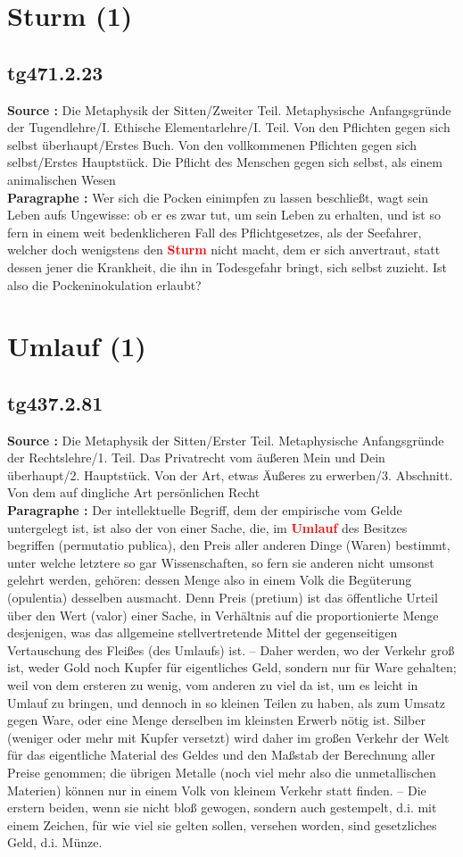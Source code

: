 \documentclass[a4paper,12pt,twoside]{book}
\newcommand{\match}[1]{\textcolor{red}{\textbf{#1}}}
\newcommand{\unnumberedsection}[1]{
	\section*{#1}
	\addcontentsline{toc}{section}{#1}
	\markright{#1}
}
\begin{document}
	\unnumberedsection{Sturm (1)} 
	\subsection*{tg471.2.23} 
	\textbf{Source : }Die Metaphysik der Sitten/Zweiter Teil. Metaphysische Anfangsgründe der Tugendlehre/I. Ethische Elementarlehre/I. Teil. Von den Pflichten gegen sich selbst überhaupt/Erstes Buch. Von den vollkommenen Pflichten gegen sich selbst/Erstes Hauptstück. Die Pflicht des Menschen gegen sich selbst, als einem animalischen Wesen\\  
	
	\textbf{Paragraphe : }Wer sich die Pocken einimpfen zu lassen beschließt, wagt sein Leben aufs Ungewisse: ob er es zwar tut, um sein Leben zu erhalten, und ist so fern in einem weit bedenklicheren Fall des Pflichtgesetzes, als der Seefahrer, welcher doch wenigstens den \match{Sturm} nicht macht, dem er sich anvertraut, statt dessen jener die Krankheit, die ihn in Todesgefahr bringt, sich selbst zuzieht. Ist also die Pockeninokulation erlaubt? 
	
	\unnumberedsection{Umlauf (1)} 
	\subsection*{tg437.2.81} 
	\textbf{Source : }Die Metaphysik der Sitten/Erster Teil. Metaphysische Anfangsgründe der Rechtslehre/1. Teil. Das Privatrecht vom äußeren Mein und Dein überhaupt/2. Hauptstück. Von der Art, etwas Äußeres zu erwerben/3. Abschnitt. Von dem auf dingliche Art persönlichen Recht\\  
	
	\textbf{Paragraphe : }Der intellektuelle Begriff, dem der empirische vom Gelde untergelegt ist, ist also der von einer Sache, die, im \match{Umlauf} des Besitzes begriffen (permutatio publica), den Preis aller anderen Dinge (Waren) bestimmt, unter welche letztere so gar Wissenschaften, so fern sie anderen nicht umsonst gelehrt werden, gehören: dessen Menge also in einem Volk die Begüterung (opulentia) desselben ausmacht. Denn Preis (pretium) ist das öffentliche Urteil über den Wert (valor) einer Sache, in Verhältnis auf die proportionierte Menge desjenigen, was das allgemeine stellvertretende Mittel der gegenseitigen Vertauschung des Fleißes (des Umlaufs) ist. – Daher werden, wo der Verkehr groß ist, weder Gold noch Kupfer für eigentliches Geld, sondern nur für Ware gehalten; weil von dem ersteren zu wenig, vom anderen zu viel da ist, um es leicht in Umlauf zu bringen, und dennoch in so kleinen Teilen zu haben, als zum Umsatz gegen Ware, oder eine Menge derselben im kleinsten Erwerb nötig ist. Silber (weniger oder mehr mit Kupfer versetzt) wird daher im großen Verkehr der Welt für das eigentliche Material des Geldes und den Maßstab der Berechnung aller Preise genommen; die übrigen Metalle (noch viel mehr also die unmetallischen Materien) können nur in einem Volk von kleinem Verkehr statt finden. – Die erstern beiden, wenn sie nicht bloß gewogen, sondern auch gestempelt, d.i. mit einem Zeichen, für wie viel sie gelten sollen, versehen worden, sind gesetzliches Geld, d.i. Münze. 
	
\end{document}
